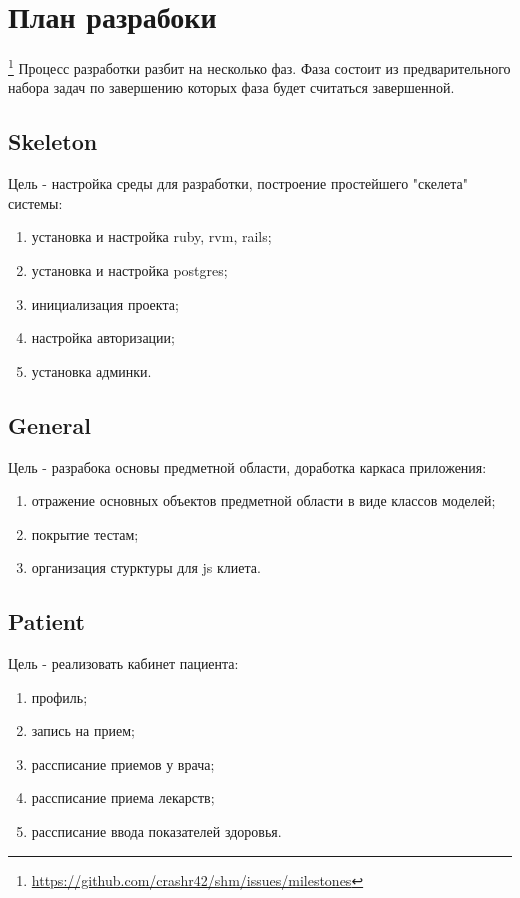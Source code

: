 \section{План разрабоки}\footnote{
	\url{https://github.com/crashr42/shm/issues/milestones}
}
Процесс разработки разбит на несколько фаз. Фаза состоит из предварительного
набора задач по завершению которых  фаза будет считаться завершенной.

\subsection{Skeleton}
Цель - настройка среды для разработки, построение простейшего "скелета" системы:
\begin{enumerate}
  \item установка и настройка ruby, rvm, rails;
  \item установка и настройка postgres;
  \item инициализация проекта;
  \item настройка авторизации;
  \item установка админки.
\end{enumerate}

\subsection{General}
Цель - разрабока основы предметной области, доработка каркаса приложения:
\begin{enumerate}
  \item отражение основных объектов предметной области в виде классов моделей;
  \item покрытие тестам;
  \item организация стурктуры для js клиета.
\end{enumerate}

\subsection{Patient}
Цель - реализовать кабинет пациента:
\begin{enumerate}
  \item профиль;
  \item запись на прием;
  \item рассписание приемов у врача;
  \item рассписание приема лекарств;
  \item рассписание ввода показателей здоровья.   
\end{enumerate}

